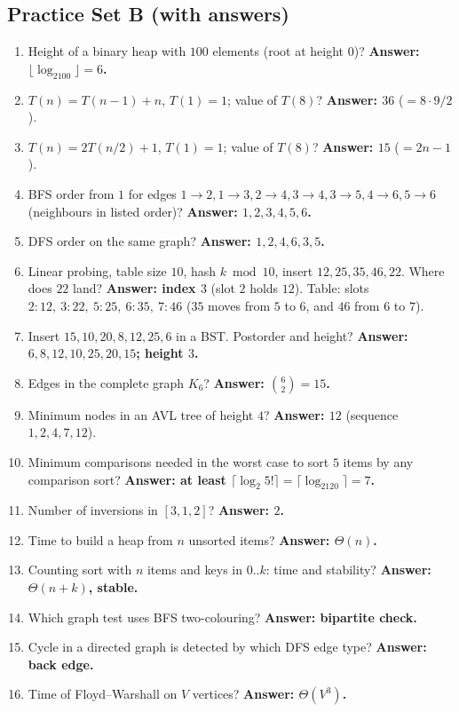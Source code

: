 \documentclass[11pt,a4paper]{article}
\begin{document}
\subsection*{Practice Set B (with answers)}
\begin{enumerate}[leftmargin=*,itemsep=3pt]
\item Height of a binary heap with $100$ elements (root at height $0$)? \textbf{Answer: $\lfloor\log_2100\rfloor=6$.}
\item $T(n)=T(n-1)+n$, $T(1)=1$; value of $T(8)$? \textbf{Answer: $36$} ($=8\cdot9/2$).
\item $T(n)=2T(n/2)+1$, $T(1)=1$; value of $T(8)$? \textbf{Answer: $15$} ($=2n-1$).
\item BFS order from $1$ for edges $1{\to}2,1{\to}3,2{\to}4,3{\to}4,3{\to}5,4{\to}6,5{\to}6$ (neighbours in listed order)? \textbf{Answer: $1,2,3,4,5,6$.}
\item DFS order on the same graph? \textbf{Answer: $1,2,4,6,3,5$.}
\item Linear probing, table size $10$, hash $k\bmod10$, insert $12,25,35,46,22$. Where does $22$ land? \textbf{Answer: index $3$} (slot $2$ holds $12$). Table: slots $2{:}12,\ 3{:}22,\ 5{:}25,\ 6{:}35,\ 7{:}46$ ($35$ moves from $5$ to $6$, and $46$ from $6$ to $7$).
\item Insert $15,10,20,8,12,25,6$ in a BST. Postorder and height? \textbf{Answer: $6,8,12,10,25,20,15$; height $3$.}
\item Edges in the complete graph $K_6$? \textbf{Answer: $\binom62=15$.}
\item Minimum nodes in an AVL tree of height $4$? \textbf{Answer: $12$} (sequence $1,2,4,7,12$).
\item Minimum comparisons needed in the worst case to sort $5$ items by any comparison sort? \textbf{Answer: at least $\lceil\log_2 5!\rceil=\lceil\log_2120\rceil=7$.}
\item Number of inversions in $[3,1,2]$? \textbf{Answer: $2$.}
\item Time to build a heap from $n$ unsorted items? \textbf{Answer: $\Theta(n)$.}
\item Counting sort with $n$ items and keys in $0..k$: time and stability? \textbf{Answer: $\Theta(n+k)$, stable.}
\item Which graph test uses BFS two-colouring? \textbf{Answer: bipartite check.}
\item Cycle in a directed graph is detected by which DFS edge type? \textbf{Answer: back edge.}
\item Time of Floyd--Warshall on $V$ vertices? \textbf{Answer: $\Theta(V^3)$.}

\end{enumerate}
\end{document}
